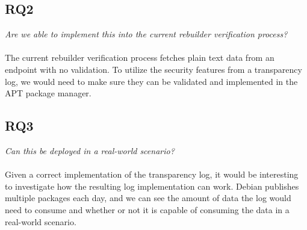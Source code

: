 \documentclass[../Main/thesis.tex]{subfiles}
\begin{document}
\subsection*{RQ2}%
\label{sub:rq2}
\textit{Are we able to implement this into the current rebuilder verification process?}
\\\\
The current rebuilder verification process fetches plain text data from an
endpoint with no validation. To utilize the security features from a
transparency log, we would need to make sure they can be validated and
implemented in the APT package manager.

\subsection*{RQ3}%
\label{sub:rq3}
\textit{Can this be deployed in a real-world scenario?}
\\\\
Given a correct implementation of the transparency log, it would be interesting
to investigate how the resulting log implementation can work. Debian publishes
multiple packages each day, and we can see the amount of data the log would need
to consume and whether or not it is capable of consuming the data in a
real-world scenario.
\end{document}
